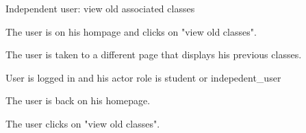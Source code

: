 
\begin{uc}{Independent user: view old associated classes}

    \begin{uc-mss}
    \item The user is on his hompage and clicks on "view old classes".
    \item The user is taken to a different page that displays his previous classes.
    \end{uc-mss}

    \begin{uc-pre}
    \item User is logged in and his actor role is student or indepedent_user
    \end{uc-pre}

    \begin{uc-post}
    \item The user is back on his homepage. 
    \end{uc-post}

    \begin{uc-trig}
        The user clicks on "view old classes".
    \end{uc-trig}

\end{uc}

